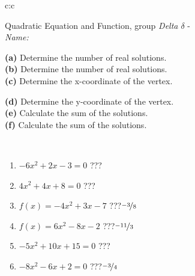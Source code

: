 \documentclass[10pt]{report}
\begin{document}
\begin{tabular}{c:c}
\begin{minipage}[c][104.5mm][t]{0.5\linewidth}
\begin{center}
\vspace{7mm}
{\huge {\LARGE Quadratic Equation and Function}, group \textit{Delta $\delta$} -}\\[5mm]
\textit{Name:}\phantom{xxxxxxxxxxxxxxxxxxxxxxxxxxxxxxxxxxxxxxxxxxxxxxxxxxxxxxxxxxxxxxxxx}\\[5mm]
\begin{minipage}{0.95\linewidth}
\begin{center}
{\small \begin{minipage}{0.5\textwidth}
\textbf{(a)} Determine the number of real solutions. \\[1mm]
\textbf{(b)} Determine the number of real solutions. \\[1mm]
\textbf{(c)} Determine the x-coordinate of the vertex.
\end{minipage} \begin{minipage}{0.49\textwidth}
\textbf{(d)} Determine the y-coordinate of the vertex. \\[1mm]
\textbf{(e)} Calculate the sum of the solutions. \\[1mm]
\textbf{(f)} Calculate the sum of the solutions.
\end{minipage}
}
\end{center}
\end{minipage}
\\[4mm]
\begin{minipage}{0.79\linewidth}
\begin{center}
\begin{varwidth}{\linewidth}
\begin{enumerate}
\Large
\item $-6x^2+2x-3=0$\quad \dotfill\; ???\;\dotfill {}
\item $4x^2+4x+8=0$\quad \dotfill\; ???\;\dotfill {}
\item $f(x)=-4x^2+3x-7$\quad \dotfill\; ???\;\dotfill \quad $\nicefrac{-3}{8}$
\item $f(x)=6x^2-8x-2$\quad \dotfill\; ???\;\dotfill \quad $\nicefrac{-11}{3}$
\item $-5x^2+10x+15=0$\quad \dotfill\; ???\;\dotfill {}
\item $-8x^2-6x+2=0$\quad \dotfill\; ???\;\dotfill \quad $\nicefrac{-3}{4}$
\end{enumerate}
\end{varwidth}

\end{center}
\end{minipage}
\end{center}
\end{minipage}
\end{tabular}
\end{document}
